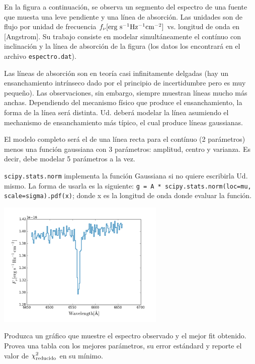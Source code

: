 \documentclass[letter, 11pt]{article}
\begin{document}
En la figura a continuación, se observa un segmento del espectro de una fuente
que muesta una leve pendiente y una línea de absorción. Las unidades son de
flujo por unidad de frecuencia $f_\nu [{\rm erg\ s^{-1} Hz^{-1} cm^{-2}}]$ vs.
longitud de onda en [Angstrom]. Su trabajo consiste en modelar simultáneamente
el contínuo con inclinación y la línea de absorción de la figura (los datos los
encontrará en el archivo \texttt{espectro.dat}).

Las líneas de absorción son en teoría casi infinitamente delgadas (hay un
ensanchamiento intrínseco dado por el principio de incertidumbre pero es muy
pequeño). Las observaciones, sin embargo, siempre muestran líneas mucho más
anchas. Dependiendo del mecanismo físico que produce el ensanchamiento, la
forma de la línea será distinta. Ud. deberá modelar la línea asumiendo el
mechanismo de ensanchamiento más típico, el cual produce líneas gaussianas.

El modelo completo será el de una línea recta para el contínuo (2 parámetros)
menos una función gaussiana con 3 parámetros: amplitud, centro y varianza. Es
decir, debe modelar 5 parámetros a la vez.

\begin{ayuda}
    \texttt{scipy.stats.norm} implementa la función Gaussiana si no quiere
    escribirla Ud. mismo. La forma de usarla es la siguiente: \texttt{g = A *
    scipy.stats.norm(loc=mu, scale=sigma).pdf(x)}; donde x es la longitud de
    onda donde evaluar la función.
\end{ayuda}

\begin{center}
\includegraphics[width=0.6\textwidth]{spectrum.png}
\end{center}

Produzca un gráfico que muestre el espectro observado y el mejor fit obtenido.
Provea una tabla con los mejores parámetros, su error estándard y reporte el
valor de $\chi^2_{\rm reducido}$ en su mínimo.
\end{document}
